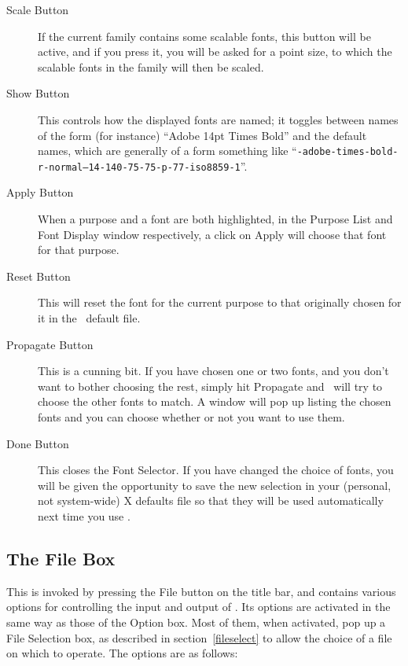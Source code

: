 \begin{description}
\item[Scale Button] If the current family contains some scalable
fonts, this button will be active, and if you press it, you will be
asked for a point size, to which the scalable fonts in the family will
then be scaled.

\item[Show Button] This controls how the displayed fonts are named; it
toggles between names of the form (for instance) ``Adobe 14pt Times
Bold'' and the default names, which are generally of a form something
like ``{\tt -adobe-times-bold-r-normal--14-140-75-75-p-77-iso8859-1}''.

\item[Apply Button] When a purpose and a font are both highlighted, in
the Purpose List and Font Display window respectively, a click on
Apply will choose that font for that purpose.

\item[Reset Button] This will reset the font for the current purpose
to that originally chosen for it in the \xr\ default file.

\item[Propagate Button] This is a cunning bit.  If you have chosen one
or two fonts, and you don't want to bother choosing the rest, simply
hit Propagate and \xr\ will try to choose the other fonts to match.  A
window will pop up listing the chosen fonts and you can choose whether
or not you want to use them.

\item[Done Button] This closes the Font Selector.  If you have changed
the choice of fonts, you will be given the opportunity to save the new
selection in your (personal, not system-wide) X defaults file so that
they will be used automatically next time you use \xr{}.

\end{description}

\subsection{The File Box}\label{file}

This is invoked by pressing the File button on the title bar, and
contains various options for controlling the input and output of
\REDUCE.  Its options are activated in the same way as those of the
Option box.  Most of them, when activated, pop up a File Selection
box, as described in section~\ref{fileselect} to allow the choice of a
file on which to operate.  The options are as follows:

